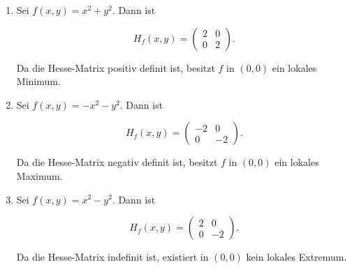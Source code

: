 \begin{beispielbox}
\begin{enumerate}
    \item Sei $ f(x,y) = x^2 + y^2 $. Dann ist
    

$$
    H_f(x,y) = \begin{pmatrix} 2 & 0 \\ 0 & 2 \end{pmatrix}.
    $$


    Da die Hesse-Matrix positiv definit ist, besitzt $ f $ in $ (0,0) $ ein lokales Minimum.
    
    \item Sei $ f(x,y) = -x^2 - y^2 $. Dann ist
    

$$
    H_f(x,y) = \begin{pmatrix} -2 & 0 \\ 0 & -2 \end{pmatrix}.
    $$


    Da die Hesse-Matrix negativ definit ist, besitzt $ f $ in $ (0,0) $ ein lokales Maximum.
    
    \item Sei $ f(x,y) = x^2 - y^2 $. Dann ist
    

$$
    H_f(x,y) = \begin{pmatrix} 2 & 0 \\ 0 & -2 \end{pmatrix}.
    $$


    Da die Hesse-Matrix indefinit ist, existiert in $ (0,0) $ kein lokales Extremum.
\end{enumerate}
\end{beispielbox}
